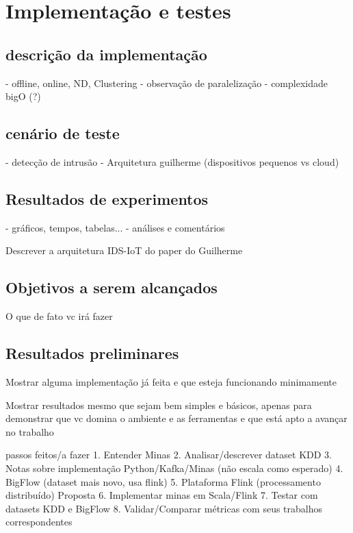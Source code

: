 \chapter{Implementação e testes}


\section{descrição da implementação}
    - offline, online, ND, Clustering
    - observação de paralelização
    - complexidade bigO (?)
\section{cenário de teste }
    - detecção de intrusão
    - Arquitetura guilherme (dispositivos pequenos vs cloud)
\section{Resultados de experimentos}
    - gráficos, tempos, tabelas...
    - análises e comentários


Descrever a arquitetura IDS-IoT do paper do Guilherme

\section{Objetivos a serem alcançados}

O que de fato vc irá fazer 

\section{Resultados preliminares}

Mostrar alguma implementação já feita e que esteja funcionando minimamente

Mostrar resultados mesmo que sejam bem simples e básicos, apenas para demonstrar que vc domina o ambiente e as ferramentas e que está apto a avançar no trabalho 

passos feitos/a fazer
1. Entender Minas
2. Analisar/descrever dataset KDD
3. Notas sobre implementação Python/Kafka/Minas (não escala como esperado)
4. BigFlow (dataset mais novo, usa flink)
5. Plataforma Flink (processamento distribuído)
Proposta
6. Implementar minas em Scala/Flink
7. Testar com datasets KDD e BigFlow
8. Validar/Comparar métricas com seus trabalhos correspondentes

